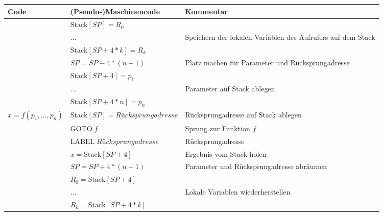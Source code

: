 \documentclass[border=0.2cm, convert={density=600}]{standalone}
\begin{document}
\renewcommand\arraystretch{1.3}
\begin{tabular}{|l|l|l|}
	\hline\rowcolor{lightgray}
	Code & (Pseudo-)Maschinencode & Kommentar\\
	\hline
	                         & $\textrm{Stack}[SP] = R_0$ & \\
	                         & $\ldots$                   & Speichern der lokalen Variablen des Aufrufers auf dem Stack\\
	                         & $\textrm{Stack}[SP + 4\ast k] = R_k$ & \\
	\cline{2-3}
	                         & $ SP = SP-4 \ast (n+1)$ & Platz machen für Parameter und Rücksprungadresse\\
	\cline{2-3}
	                         & $ \textrm{Stack}[SP + 4] = p_1$ & \\
	                         & $\ldots$ & Parameter auf Stack ablegen\\
	                         & $\textrm{Stack}[SP + 4\ast n] = p_n$ & \\
	\cline{2-3}
	$x = f(p_1,\ldots, p_n)$ & $\textrm{Stack}[SP] = \textit{Rücksprungadresse}$ & Rücksprungadresse auf Stack ablegen\\
	\cline{2-3}
	                         & $\mathrm{GOTO}\; f$ & Sprung zur Funktion $f$\\
	\cline{2-3}
	                         & $\mathrm{LABEL}\; \textit{Rücksprungadresse}$ & Rücksprungadresse\\
	\cline{2-3}
	                         & $x = \textrm{Stack}[SP + 4]$ & Ergebnis vom Stack holen\\
	\cline{2-3}
	                         & $SP = SP + 4\ast (n+1)$ & Parameter und Rücksprungadresse abräumen\\
	\cline{2-3}
	                         & $R_0 = \textrm{Stack}[SP + 4]$ & \\
	                         & $\ldots$ & Lokale Variablen wiederherstellen \\
	                         & $R_k = \textrm{Stack}[SP + 4\ast k]$& \\
	\hline
\end{tabular}
\end{document}
